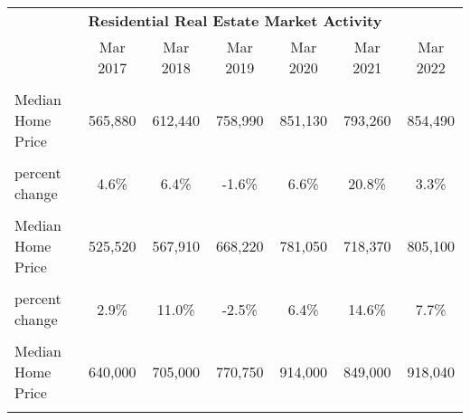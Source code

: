 \begin{table}
\centering
\begin{tabular}{lcccccc}
\toprule
\multicolumn{7}{c}{\textbf{Residential Real Estate Market Activity}} \\
\cmidrule(l{3pt}r{3pt}){1-7}
  & Mar 2017 & Mar 2018 & Mar 2019 & Mar 2020 & Mar 2021 & Mar 2022\\
\midrule
\textbf{\cellcolor{gray!10}{California}} & \textbf{\cellcolor{gray!10}{}} & \textbf{\cellcolor{gray!10}{}} & \textbf{\cellcolor{gray!10}{}} & \textbf{\cellcolor{gray!10}{}} & \textbf{\cellcolor{gray!10}{}} & \textbf{\cellcolor{gray!10}{}}\\
Median Home Price & 565,880 & 612,440 & 758,990 & 851,130 & 793,260 & 854,490\\
\cellcolor{gray!10}{Median Home Price (\$2009)} & \cellcolor{gray!10}{451,839} & \cellcolor{gray!10}{480,908} & \cellcolor{gray!10}{473,036} & \cellcolor{gray!10}{504,178} & \cellcolor{gray!10}{608,807} & \cellcolor{gray!10}{629,143}\\
percent change & 4.6\% & 6.4\% & -1.6\% & 6.6\% & 20.8\% & 3.3\%\\
\textbf{\cellcolor{gray!10}{Los Angeles County}} & \textbf{\cellcolor{gray!10}{}} & \textbf{\cellcolor{gray!10}{}} & \textbf{\cellcolor{gray!10}{}} & \textbf{\cellcolor{gray!10}{}} & \textbf{\cellcolor{gray!10}{}} & \textbf{\cellcolor{gray!10}{}}\\
\addlinespace
Median Home Price & 525,520 & 567,910 & 668,220 & 781,050 & 718,370 & 805,100\\
\cellcolor{gray!10}{Median Home Price (\$2009)} & \cellcolor{gray!10}{405,845} & \cellcolor{gray!10}{450,384} & \cellcolor{gray!10}{439,298} & \cellcolor{gray!10}{467,520} & \cellcolor{gray!10}{535,998} & \cellcolor{gray!10}{577,340}\\
percent change & 2.9\% & 11.0\% & -2.5\% & 6.4\% & 14.6\% & 7.7\%\\
\textbf{\cellcolor{gray!10}{Ventura County}} & \textbf{\cellcolor{gray!10}{}} & \textbf{\cellcolor{gray!10}{}} & \textbf{\cellcolor{gray!10}{}} & \textbf{\cellcolor{gray!10}{}} & \textbf{\cellcolor{gray!10}{}} & \textbf{\cellcolor{gray!10}{}}\\
Median Home Price & 640,000 & 705,000 & 770,750 & 914,000 & 849,000 & 918,040\\
\addlinespace
\cellcolor{gray!10}{Median Home Price (\$2009)} & \cellcolor{gray!10}{546,284} & \cellcolor{gray!10}{543,632} & \cellcolor{gray!10}{534,995} & \cellcolor{gray!10}{580,376} & \cellcolor{gray!10}{618,240} & \cellcolor{gray!10}{675,615}\\

\end{tabular}
\end{table}
